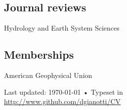 \documentclass[10pt, a4paper]{article}
\begin{document}
\subsection*{Journal reviews}
Hydrology and Earth System Sciences

\subsection*{Memberships}
American Geophysical Union

\vfill{}

\begin{center}
{\scriptsize  Last updated: \today\- •\- 
Typeset in \href{http://nitens.org/taraborelli/cvtex}{
\XeTeX }\\
\href{http://www.github.com/dgianotti/CV}{http://www.github.com/dgianotti/CV}}
\end{center}
\end{document}

